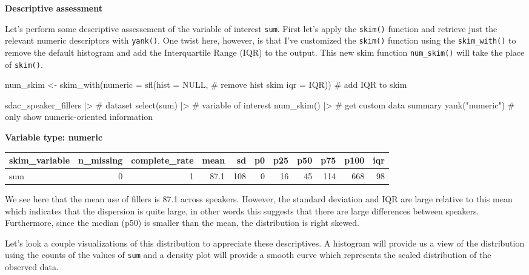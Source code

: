\documentclass[
  letterpaper,
]{latex/krantz}
\newenvironment{Shaded}{\begin{snugshade}}{\end{snugshade}}
\newcommand{\AttributeTok}[1]{\textcolor[rgb]{0.40,0.45,0.13}{#1}}
\newcommand{\CommentTok}[1]{\textcolor[rgb]{0.37,0.37,0.37}{#1}}
\newcommand{\ConstantTok}[1]{\textcolor[rgb]{0.56,0.35,0.01}{#1}}
\newcommand{\FunctionTok}[1]{\textcolor[rgb]{0.28,0.35,0.67}{#1}}
\newcommand{\NormalTok}[1]{\textcolor[rgb]{0.00,0.23,0.31}{#1}}
\newcommand{\OtherTok}[1]{\textcolor[rgb]{0.00,0.23,0.31}{#1}}
\newcommand{\SpecialCharTok}[1]{\textcolor[rgb]{0.37,0.37,0.37}{#1}}
\newcommand{\StringTok}[1]{\textcolor[rgb]{0.13,0.47,0.30}{#1}}
\begin{document}
\textbf{Descriptive assessment}

Let's perform some descriptive assessement of the variable of interest
\texttt{sum}. First let's apply the \texttt{skim()} function and
retrieve just the relevant numeric descriptors with \texttt{yank()}. One
twist here, however, is that I've customized the \texttt{skim()}
function using the \texttt{skim\_with()} to remove the default histogram
and add the Interquartile Range (IQR) to the output. This new skim
function \texttt{num\_skim()} will take the place of \texttt{skim()}.

\begin{Shaded}
\begin{Highlighting}[]
\NormalTok{num\_skim }\OtherTok{\textless{}{-}} 
  \FunctionTok{skim\_with}\NormalTok{(}\AttributeTok{numeric =} \FunctionTok{sfl}\NormalTok{(}\AttributeTok{hist =} \ConstantTok{NULL}\NormalTok{, }\CommentTok{\# remove hist skim}
                                   \AttributeTok{iqr =}\NormalTok{ IQR)) }\CommentTok{\# add IQR to skim}

\NormalTok{sdac\_speaker\_fillers }\SpecialCharTok{|\textgreater{}} \CommentTok{\# dataset}
  \FunctionTok{select}\NormalTok{(sum) }\SpecialCharTok{|\textgreater{}} \CommentTok{\# variable of interest}
  \FunctionTok{num\_skim}\NormalTok{() }\SpecialCharTok{|\textgreater{}} \CommentTok{\# get custom data summary}
  \FunctionTok{yank}\NormalTok{(}\StringTok{"numeric"}\NormalTok{) }\CommentTok{\# only show numeric{-}oriented information}
\end{Highlighting}
\end{Shaded}

\textbf{Variable type: numeric}

\begin{tabular}{l|r|r|r|r|r|r|r|r|r|r}
\hline
skim\_variable & n\_missing & complete\_rate & mean & sd & p0 & p25 & p50 & p75 & p100 & iqr\\
\hline
sum & 0 & 1 & 87.1 & 108 & 0 & 16 & 45 & 114 & 668 & 98\\
\hline
\end{tabular}

We see here that the mean use of fillers is 87.1 across speakers.
However, the standard deviation and IQR are large relative to this mean
which indicates that the dispersion is quite large, in other words this
suggests that there are large differences between speakers. Furthermore,
since the median (p50) is smaller than the mean, the distribution is
right skewed.

Let's look a couple visualizations of this distribution to appreciate
these descriptives. A histogram will provide us a view of the
distribution using the counts of the values of \texttt{sum} and a
density plot will provide a smooth curve which represents the scaled
distribution of the observed data.
\end{document}
